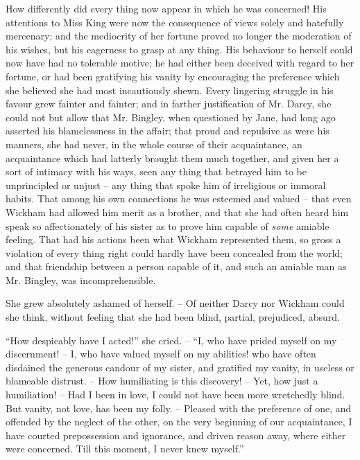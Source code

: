 How differently did every thing now appear in which
he was concerned! His attentions to Miss King were
now the consequence of views solely and hatefully mercenary;
and the mediocrity of her fortune proved no longer
the moderation of his wishes, but his eagerness to grasp
at any thing. His behaviour to herself could now have
had no tolerable motive; he had either been deceived
with regard to her fortune, or had been gratifying his
vanity by encouraging the preference which she believed
she had most incautiously shewn. Every lingering struggle
in his favour grew fainter and fainter; and in farther
justification of Mr. Darcy, she could not but allow that
Mr. Bingley, when questioned by Jane, had long ago
asserted his blamelessness in the affair; that proud and
repulsive as were his manners, she had never, in the whole
course of their acquaintance, an acquaintance which had
latterly brought them much together, and given her a sort
of intimacy with his ways, seen any thing that betrayed
him to be unprincipled or unjust -- any thing that spoke
him of irreligious or immoral habits. That among his
own connections he was esteemed and valued -- that even
Wickham had allowed him merit as a brother, and that
she had often heard him speak so affectionately of his
sister as to prove him capable of \textit{some} amiable feeling.
That had his actions been what Wickham represented
them, so gross a violation of every thing right could hardly
have been concealed from the world; and that friendship
between a person capable of it, and such an amiable man
as Mr. Bingley, was incomprehensible.

She grew absolutely ashamed of herself. -- Of neither
Darcy nor Wickham could she think, without feeling that
she had been blind, partial, prejudiced, absurd.

“How despicably have I acted!” she cried. -- “I, who
have prided myself on my discernment! -- I, who have
valued myself on my abilities! who have often disdained
the generous candour of my sister, and gratified my vanity,
in useless or blameable distrust. -- How humiliating is this
discovery! -- Yet, how just a humiliation! -- Had I been
in love, I could not have been more wretchedly blind.
But vanity, not love, has been my folly. -- Pleased with
the preference of one, and offended by the neglect of the
other, on the very beginning of our acquaintance, I have
courted prepossession and ignorance, and driven reason
away, where either were concerned. Till this moment,
I never knew myself.”

